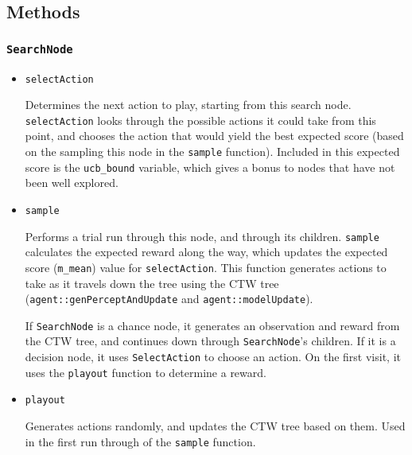 \documentclass[pdftex,twoside,a4paper]{report}
\begin{document}
\subsection{Methods}

\subsubsection*{\texttt{SearchNode}}
\begin{itemize}
	\item{\texttt{selectAction}
	
	Determines the next action to play, starting from this search node. \texttt{selectAction} looks through the possible actions it could take from this point, and chooses the action that would yield the best expected score (based on the sampling this node in the \texttt{sample} function). Included in this expected score is the \texttt{ucb\_bound} variable, which gives a bonus to nodes that have not been well explored.
	}
	
	\item{\texttt{sample}
	
	Performs a trial run through this node, and through its children. \texttt{sample} calculates the expected reward along the way, which updates the expected score (\texttt{m\_mean}) value for \texttt{selectAction}. This function generates actions to take as it travels down the tree using the CTW tree (\texttt{agent::genPerceptAndUpdate} and \texttt{agent::modelUpdate}).
	
	If \texttt{SearchNode} is a chance node, it generates an observation and reward from the CTW tree, and continues down through \texttt{SearchNode}'s children. If it is a decision node, it uses \texttt{SelectAction} to choose an action. On the first visit, it uses the \texttt{playout} function to determine a reward.
	}
	
	\item{\texttt{playout}
	
	Generates actions randomly, and updates the CTW tree based on them. Used in the first run through of the \texttt{sample} function. 
	}
\end{itemize}
\end{document}
